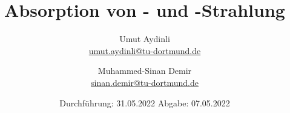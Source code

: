 

\subject{V704}
\title{Absorption von \textgamma- und \textbeta-Strahlung}
\author{Umut Aydinli \\
 \href{mailto:umut.aydinli@tu-dortmund.de}{umut.aydinli@tu-dortmund.de}
 \and Muhammed-Sinan Demir \\
 \href{mailto:sinan.demir@tu-dortmund.de}{sinan.demir@tu-dortmund.de}
 }
\date{
  Durchführung: 31.05.2022
  \hspace{3em}
  Abgabe: 07.05.2022
}




\maketitle
\tableofcontents
\newpage








\nocite{*}
\printbibliography{}

